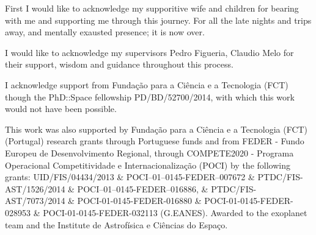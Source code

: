 \begin{acknowledgements}
First I would like to acknowledge my supporitive wife and children for bearing with me and supporting me through this journey. For all the late nights and trips away, and mentally exausted presence; it is now over.

I would like to acknowledge my supervisors Pedro Figueria, Claudio Melo for their support, wisdom and guidance throughout this process.

I acknowledge support from Funda\c{c}\~ao para a Ci\^encia e a Tecnologia (FCT)  though the PhD::Space fellowship PD/BD/52700/2014, with which this work would not have been possible.

This work was also supported by Funda\c{c}\~ao para a Ci\^encia e a Tecnologia (FCT) (Portugal) research grants through Portuguese funds and from FEDER - Fundo Europeu de Desenvolvimento Regional, through COMPETE2020 - Programa Operacional Competitividade e Internacionalização (POCI) by the following grants:
UID/FIS/04434/2013 \&
POCI--01--0145-FEDER--007672 \&
PTDC/FIS-AST/1526/2014 \&
POCI--01--0145-FEDER--016886, \&
PTDC/FIS-AST/7073/2014 \&
POCI-01-0145-FEDER-016880 \&
POCI-01-0145-FEDER-028953 \&
POCI-01-0145-FEDER-032113 (G.EANES).
Awarded to the exoplanet team and the Institute de Astrof\'{i}sica e Ci\^encias do Espa\c{c}o.

\end{acknowledgements}
